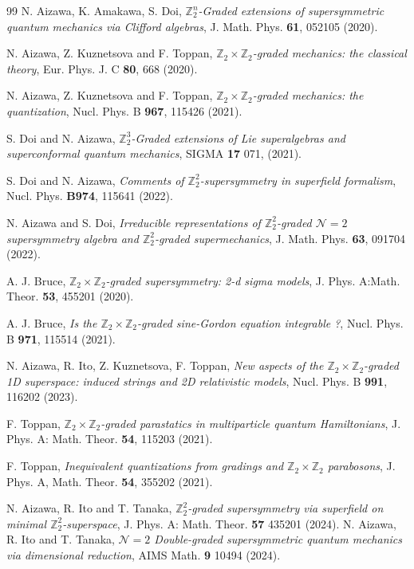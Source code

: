 \documentclass[a4paper,12pt]{article}
\theoremstyle{plain}
\theoremstyle{definition}
\begin{document}
\begin{thebibliography}{99}
 N. Aizawa, K. Amakawa, S. Doi, 
{\it $\mathbb{Z}_2^n$-Graded extensions of supersymmetric quantum mechanics via Clifford algebras}, 
J. Math. Phys. \textbf{61}, 052105 (2020).


 N. Aizawa, Z. Kuznetsova and F. Toppan,
{\it ${\mathbb Z}_2\times {\mathbb Z}_2$-graded mechanics: the classical theory},  
Eur. Phys. J. C \textbf{80}, 668 (2020).

 N. Aizawa, Z. Kuznetsova and F. Toppan,
{\it ${\mathbb Z}_2\times {\mathbb Z}_2$-graded mechanics: the quantization},  
Nucl. Phys. B \textbf{967},  115426 (2021).


 S. Doi and N. Aizawa,
\textit{$\mathbb{Z}_2^3$-Graded extensions of Lie superalgebras and superconformal quantum mechanics}, 
SIGMA	\textbf{17} 071, (2021).

 S. Doi and N. Aizawa,
\textit{Comments of $\mathbb{Z}_2^2$-supersymmetry in superfield formalism}, 
Nucl. Phys.  \textbf{B974}, 115641 (2022).

 N. Aizawa and S. Doi, 
\textit{Irreducible representations of $\mathbb{Z}_2^2$-graded $\mathcal{N} = 2$ supersymmetry algebra and $\mathbb{Z}_2^2$-graded supermechanics}, 
J. Math. Phys. \textbf{63}, 091704 (2022).

 A. J. Bruce, \textit{$\mathbb{Z}_2 \times \mathbb{Z}_2$-graded supersymmetry: 2-d sigma models},
J. Phys. A:Math. Theor. \textbf{53}, 455201 (2020).

 A. J. Bruce, \textit{Is the $\mathbb{Z}_2 \times \mathbb{Z}_2$-graded sine-Gordon equation integrable ?}, 
Nucl. Phys. B \textbf{971}, 115514 (2021).

 N. Aizawa, R. Ito, Z. Kuznetsova, F. Toppan, 
\textit{New aspects of the $\mathbb{Z}_2\times\mathbb{Z}_2$-graded 1D superspace: induced strings and 2D relativistic models}, 
Nucl. Phys. B \textbf{991},  116202 (2023).


 F. Toppan, {\it $\mathbb{Z}_{2} \times \mathbb{Z}_{2}$-graded parastatics in multiparticle quantum Hamiltonians}, J. Phys. A: Math. Theor. \textbf{54}, 115203 (2021).

 F. Toppan, \textit{Inequivalent quantizations from gradings and $ \mathbb{Z}_2 \times \mathbb{Z}_2$ parabosons}, 
J. Phys. A, Math. Theor. \textbf{54}, 355202 (2021).

N. Aizawa, R. Ito and T. Tanaka, {\textit{$\mathbb{Z}_2^2$-graded supersymmetry via superfield on minimal 
$\mathbb{Z}_2^2$-superspace}}, 
J. Phys. A: Math. Theor. {\bf 57}  435201 (2024).
N. Aizawa, R. Ito and T. Tanaka, {\textit{$\mathcal{N}=2$ Double-graded supersymmetric quantum mechanics via dimensional reduction}},
AIMS Math. {\bf 9} 10494 (2024).


\end{thebibliography}
\end{document}
